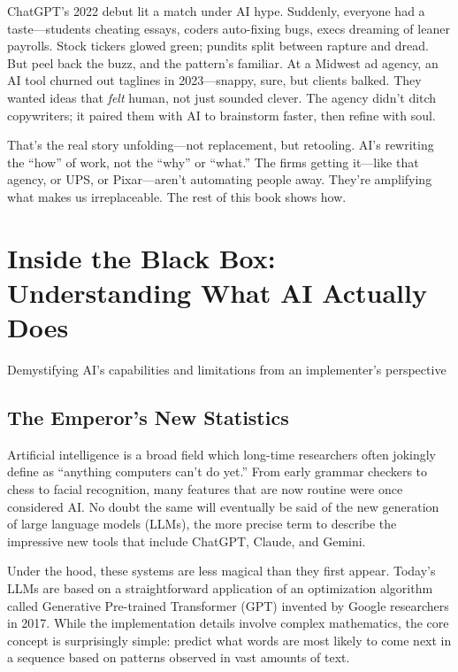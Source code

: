 \documentclass[
  Letterpaper,
]{scrbook}
\begin{document}
ChatGPT's 2022 debut lit a match under AI hype. Suddenly, everyone had a
taste---students cheating essays, coders auto-fixing bugs, execs
dreaming of leaner payrolls. Stock tickers glowed green; pundits split
between rapture and dread. But peel back the buzz, and the pattern's
familiar. At a Midwest ad agency, an AI tool churned out taglines in
2023---snappy, sure, but clients balked. They wanted ideas that
\emph{felt} human, not just sounded clever. The agency didn't ditch
copywriters; it paired them with AI to brainstorm faster, then refine
with soul.

That's the real story unfolding---not replacement, but retooling. AI's
rewriting the ``how'' of work, not the ``why'' or ``what.'' The firms
getting it---like that agency, or UPS, or Pixar---aren't automating
people away. They're amplifying what makes us irreplaceable. The rest of
this book shows how.


\chapter{Inside the Black Box: Understanding What AI Actually
Does}\label{inside-the-black-box-understanding-what-ai-actually-does}

Demystifying AI's capabilities and limitations from an implementer's
perspective

\hfill\break

\section{The Emperor's New
Statistics}\label{the-emperors-new-statistics}

Artificial intelligence is a broad field which long-time researchers
often jokingly define as ``anything computers can't do yet.'' From early
grammar checkers to chess to facial recognition, many features that are
now routine were once considered AI. No doubt the same will eventually
be said of the new generation of large language models (LLMs), the more
precise term to describe the impressive new tools that include ChatGPT,
Claude, and Gemini.

Under the hood, these systems are less magical than they first appear.
Today's LLMs are based on a straightforward application of an
optimization algorithm called Generative Pre-trained Transformer (GPT)
invented by Google researchers in 2017. While the implementation details
involve complex mathematics, the core concept is surprisingly simple:
predict what words are most likely to come next in a sequence based on
patterns observed in vast amounts of text.
\end{document}
